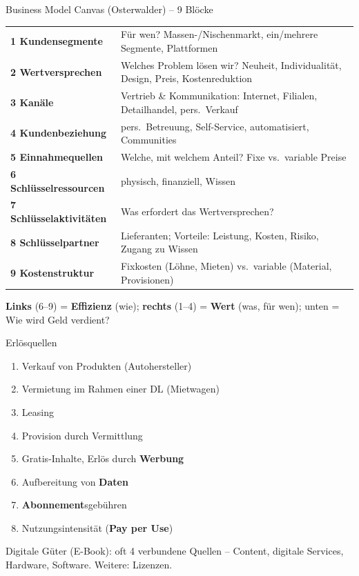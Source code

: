 \documentclass[a4paper, fontsize=7pt]{scrartcl}
\renewcommand*{\arraystretch}{1.5}  %
\begin{document}
\begin{mainbox}{Business Model Canvas (Osterwalder) -- 9 Blöcke}
\renewcommand*{\arraystretch}{1.2}
\begin{tabularx}{\linewidth}{@{}lX@{}}
\textbf{1 Kundensegmente} & Für wen? Massen-/Nischenmarkt, ein/mehrere
Segmente, Plattformen \\
\textbf{2 Wertversprechen} & Welches Problem lösen wir? Neuheit,
Individualität, Design, Preis, Kostenreduktion \\
\textbf{3 Kanäle} & Vertrieb \& Kommunikation: Internet, Filialen,
Detailhandel, pers.\ Verkauf \\
\textbf{4 Kundenbeziehung} & pers.\ Betreuung, Self-Service, automatisiert,
Communities \\
\textbf{5 Einnahmequellen} & Welche, mit welchem Anteil? Fixe vs.\ variable
Preise \\
\textbf{6 Schlüsselressourcen} & physisch, finanziell, Wissen \\
\textbf{7 Schlüsselaktivitäten} & Was erfordert das Wertversprechen? \\
\textbf{8 Schlüsselpartner} & Lieferanten; Vorteile: Leistung, Kosten,
Risiko, Zugang zu Wissen \\
\textbf{9 Kostenstruktur} & Fixkosten (Löhne, Mieten) vs.\ variable (Material,
Provisionen) \\
\end{tabularx}
\textbf{Links} (6--9) = \textbf{Effizienz} (wie); \textbf{rechts} (1--4) =
\textbf{Wert} (was, für wen); unten = Wie wird Geld verdient?
\end{mainbox}

\begin{mainbox}{Erlösquellen}
\begin{enumerate}
    \item Verkauf von Produkten (Autohersteller)
    \item Vermietung im Rahmen einer DL (Mietwagen)
    \item Leasing
    \item Provision durch Vermittlung
    \item Gratis-Inhalte, Erlös durch \textbf{Werbung}
    \item Aufbereitung von \textbf{Daten}
    \item \textbf{Abonnement}sgebühren
    \item Nutzungsintensität (\textbf{Pay per Use})
\end{enumerate}
Digitale Güter (E-Book): oft 4 verbundene Quellen -- Content, digitale
Services, Hardware, Software. Weitere: Lizenzen.
\end{mainbox}
\end{document}
